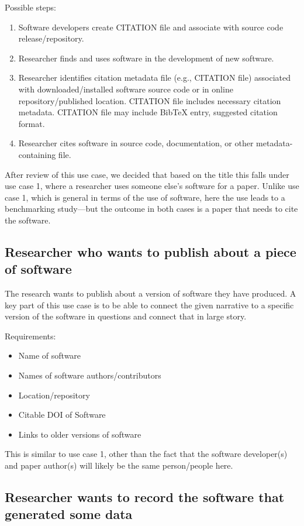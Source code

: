 \documentclass[12pt, oneside]{amsart}
\begin{document}
Possible steps:
\begin{enumerate} \setcounter{enumi}{0}
\item Software developers create CITATION file and associate with source code release/repository.
\item Researcher finds and uses software in the development of new software.
\item Researcher identifies citation metadata file (e.g., CITATION file) associated with downloaded/installed software source code or in online repository/published location. CITATION file includes necessary citation metadata. CITATION file may include BibTeX entry, suggested citation format.
\item Researcher cites software in source code, documentation, or other metadata-containing file.
\end{enumerate}

After review of this use case, we decided that based on the title this falls under
use case 1, where a researcher uses someone else's software for a paper.
Unlike use case 1, which is general in terms of the use of software, here the
use leads to a benchmarking study---but the outcome in both cases is a paper
that needs to cite the software.

\subsection*{Researcher who wants to publish about a piece of software}

The research wants to publish about a version of software they have produced.
A key part of this use case is to be able to connect the given narrative to a specific version of the software in questions and connect that in large story.

Requirements:
\begin{itemize}
\item Name of software
\item Names of software authors/contributors
\item Location/repository
\item Citable DOI of Software
\item Links to older versions of software
\end{itemize}

This is similar to use case 1, other than the fact that the software developer(s) and
paper author(s) will likely be the same person\slash people here.


\subsection*{Researcher wants to record the software that generated some data}
\end{document}
